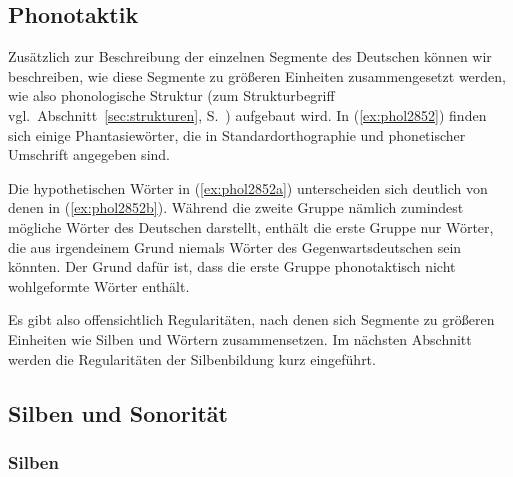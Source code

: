 \subsection{Phonotaktik}

Zusätzlich zur Beschreibung der einzelnen Segmente des Deutschen können wir beschreiben, wie diese Segmente zu größeren Einheiten zusammengesetzt werden, wie also phonologische Struktur (zum Strukturbegriff vgl.\ Abschnitt~\ref{sec:strukturen}, S.~\pageref{sec:strukturen}) aufgebaut wird.
In (\ref{ex:phol2852}) finden sich einige Phantasiewörter, die in Standardorthographie und phonetischer Umschrift angegeben sind.

\begin{exe}
  \ex\label{ex:phol2852}
  \begin{xlist}
  \end{xlist}
\end{exe}

Die hypothetischen Wörter in (\ref{ex:phol2852a}) unterscheiden sich deutlich von denen in (\ref{ex:phol2852b}).
Während die zweite Gruppe nämlich zumindest mögliche Wörter des Deutschen darstellt, enthält die erste Gruppe nur Wörter, die aus irgendeinem Grund niemals Wörter des Gegenwartsdeutschen sein könnten.
Der Grund dafür ist, dass die erste Gruppe phonotaktisch nicht wohlgeformte Wörter enthält.


Es gibt also offensichtlich Regularitäten, nach denen sich Segmente zu größeren Einheiten wie Silben und Wörtern zusammensetzen.
Im nächsten Abschnitt werden die Regularitäten der Silbenbildung kurz eingeführt.

\subsection{Silben und Sonorität}

\label{sec:silben}

\subsubsection{Silben}

